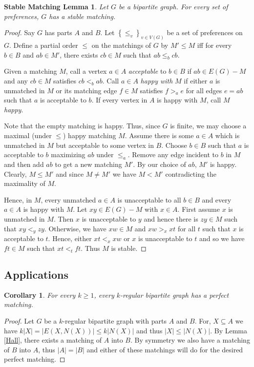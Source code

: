 \documentclass[12pt]{article}
\theoremstyle{plain}
\newtheorem{cor}[thm]{Corollary}
\newtheorem*{StableMatchingLemma}{Stable Matching Lemma}
\theoremstyle{definition}
\theoremstyle{remark}
\newcommand{\set}[1]{\left\{ #1 \right\}}
\newcommand{\card}[1]{\left|#1\right|}
\begin{document}
\begin{StableMatchingLemma}
Let $G$ be a bipartite graph.  For every set of preferences, $G$ has a stable matching.
\end{StableMatchingLemma}
\begin{proof}
Say $G$ has parts $A$ and $B$.  Let $\set{\leq_v}_{v \in V(G)}$ be a set of preferences on $G$. Define a partial order $\leq$ on the matchings of $G$ by $M' \leq M$ iff for every $b \in B$ and $ab \in M'$, there exists $cb \in M$ such that $ab \leq_b cb$.

Given a matching $M$, call a vertex $a \in A$ \emph{acceptable} to $b \in B$ if $ab \in E(G) - M$ and any $cb \in M$ satisfies $cb <_b ab$.  Call $a \in A$ \emph{happy with} $M$ if either $a$ is unmatched in $M$ or its matching edge $f \in M$ satisfies $f >_a e$ for all edges $e=ab$ such that $a$ is acceptable to $b$.  If every vertex in $A$ is happy with $M$, call $M$ \emph{happy}.

Note that the empty matching is happy.  Thus, since $G$ is finite, we may choose a maximal (under $\leq$) happy matching $M$. Assume there is some $a \in A$ which is unmatched in $M$ but acceptable to some vertex in $B$.  Choose $b \in B$ such that $a$ is acceptable to $b$ maximizing $ab$ under $\leq_a$.  Remove any edge incident to $b$ in $M$ and then add $ab$ to get a new matching $M'$.  By our choice of $ab$, $M'$ is happy.  Clearly, $M \leq M'$ and since $M \neq M'$ we have $M < M'$ contradicting the maximality of $M$.

Hence, in $M$, every unmatched $a \in A$ is unacceptable to all $b \in B$ and every $a \in A$ is happy with $M$.  Let $xy \in E(G) - M$ with $x \in A$. First assume $x$ is unmatched in $M$.  Then $x$ is unacceptable to $y$ and hence there is $zy \in M$ such that $xy <_y zy$.  Otherwise, we have $xw \in M$ and $xw >_x xt$ for all $t$ such that $x$ is acceptable to $t$.  Hence, either $xt <_x xw$ or $x$ is unacceptable to $t$ and so we have $ft \in M$ such that $xt <_t ft$.  Thus $M$ is stable.
\end{proof}

\subsection{Applications}
\begin{cor}\label{RegularBipartitePerfectMatching}
For every $k \geq 1$, every $k$-regular bipartite graph has a perfect matching.
\end{cor}
\begin{proof}
Let $G$ be a $k$-regular bipartite graph with parts $A$ and $B$. For, $X \subseteq A$ we have $k\card{X} = \card{E(X, N(X))} \leq k\card{N(X)}$ and thus $\card{X} \leq \card{N(X)}$.  By Lemma \ref{Hall}, there exists a matching of $A$ into $B$.  By symmetry we also have a matching of $B$ into $A$, thus $\card{A} = \card{B}$ and either of these matchings will do for the desired perfect matching.
\end{proof}
\end{document}
